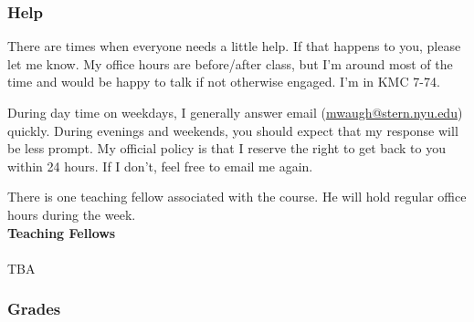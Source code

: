 \documentclass[12pt,pdftex,twoside,letterpaper]{exam}
\begin{document}
\subsubsection*{Help}

There are times when everyone needs a little help. If that happens to you, please let me know. My office hours are before/after class, but I'm around most of the time and would be happy to talk if not otherwise engaged. I'm in KMC 7-74.

During day time on weekdays, I generally answer email (\href{mailto:mwaugh@stern.nyu.edu}{mwaugh@stern.nyu.edu}) quickly. During evenings and weekends, you should expect that my response will be less prompt. My official policy is that I reserve the right to get back to you within 24 hours. If I don't, feel free to email me again.

There is one teaching fellow associated with the course. He will hold regular office hours during the week.\\

\textbf{Teaching Fellows}\\
\\
TBA

\newpage

\subsubsection*{Grades}
\end{document}
